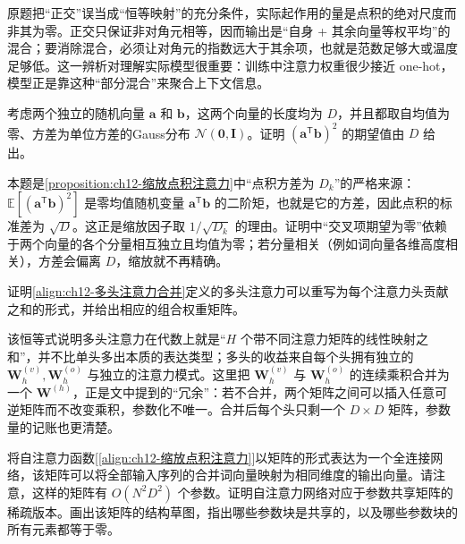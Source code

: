 \documentclass[../../main.tex]{subfiles}
\begin{document}
\begin{remark}
原题把“正交”误当成“恒等映射”的充分条件，实际起作用的量是点积的绝对尺度而非其为零。正交只保证非对角元相等，因而输出是“自身 + 其余向量等权平均”的混合；要消除混合，必须让对角元的指数远大于其余项，也就是范数足够大或温度足够低。这一辨析对理解实际模型很重要：训练中注意力权重很少接近 one-hot，模型正是靠这种“部分混合”来聚合上下文信息。
\end{remark}

\begin{exercise}[（$\star$）]\label{exercise:ch12-04}
考虑两个独立的随机向量 $\mathbf{a}$ 和 $\mathbf{b}$，这两个向量的长度均为 $D$，并且都取自均值为零、方差为单位方差的Gauss分布 $\mathcal{N}(\mathbf{0},\mathbf{I})$。证明 $\left(\mathbf{a}^{\mathsf{T}}\mathbf{b}\right)^{2}$ 的期望值由 $D$ 给出。
\end{exercise}

\begin{remark}
本题是\cref{proposition:ch12-缩放点积注意力}中“点积方差为 $D_k$”的严格来源：$\mathbb{E}[(\mathbf{a}^{\mathsf{T}}\mathbf{b})^{2}]$ 是零均值随机变量 $\mathbf{a}^{\mathsf{T}}\mathbf{b}$ 的二阶矩，也就是它的方差，因此点积的标准差为 $\sqrt{D}$。这正是缩放因子取 $1/\sqrt{D_k}$ 的理由。证明中“交叉项期望为零”依赖于两个向量的各个分量相互独立且均值为零；若分量相关（例如词向量各维高度相关），方差会偏离 $D$，缩放就不再精确。
\end{remark}

\begin{exercise}\label{exercise:ch12-05}
证明\eqref{align:ch12-多头注意力合并}定义的多头注意力可以重写为每个注意力头贡献之和的形式，并给出相应的组合权重矩阵。
\end{exercise}

\begin{remark}
该恒等式说明多头注意力在代数上就是“$H$ 个带不同注意力矩阵的线性映射之和”，并不比单头多出本质的表达类型；多头的收益来自每个头拥有独立的 $\mathbf{W}_h^{(v)},\mathbf{W}_h^{(o)}$ 与独立的注意力模式。这里把 $\mathbf{W}_h^{(v)}$ 与 $\mathbf{W}_h^{(o)}$ 的连续乘积合并为一个 $\mathbf{W}^{(h)}$，正是文中提到的“冗余”：若不合并，两个矩阵之间可以插入任意可逆矩阵而不改变乘积，参数化不唯一。合并后每个头只剩一个 $D\times D$ 矩阵，参数量的记账也更清楚。
\end{remark}

\begin{exercise}\label{exercise:ch12-06}
将自注意力函数[\eqref{align:ch12-缩放点积注意力}]以矩阵的形式表达为一个全连接网络，该矩阵可以将全部输入序列的合并词向量映射为相同维度的输出向量。请注意，这样的矩阵有 $O(N^{2}D^{2})$ 个参数。证明自注意力网络对应于参数共享矩阵的稀疏版本。画出该矩阵的结构草图，指出哪些参数块是共享的，以及哪些参数块的所有元素都等于零。
\end{exercise}
\end{document}
